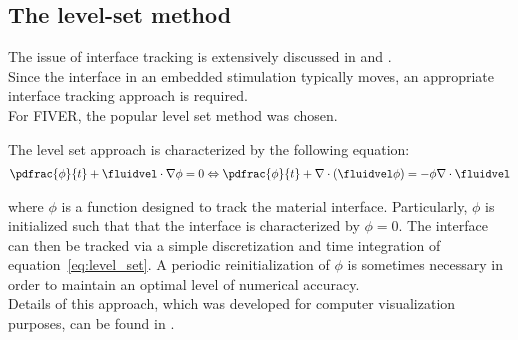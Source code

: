 \documentclass[../main.tex]{subfiles}
\begin{document}
\subsection{The level-set method}\label{sec:interface_tracking}

The issue of interface tracking is extensively discussed in \cite{Wang2012} and \cite{Fedkiw2003}.\\

Since the interface in an embedded stimulation typically moves, an appropriate interface tracking approach is required.\\
For \ac{FIVER}, the popular level set method \cite{Sethian1999} was chosen.

The level set approach is characterized by the following equation:
\begin{align}\label{eq:level_set}
\pdfrac{\phi}{t}+\fluidvel\cdot\nabla\phi=0 \Leftrightarrow \pdfrac{\phi}{t}+\nabla\cdot(\fluidvel\phi)=-\phi\nabla\cdot\fluidvel
\end{align}

where $\phi$ is a function designed to track the material interface. Particularly, $\phi$ is initialized such that that the interface is characterized by $\phi=0$. The interface can then be tracked via a simple discretization and time integration of equation~\eqref{eq:level_set}.
A periodic reinitialization of $\phi$ is sometimes necessary in order to maintain an optimal level of numerical accuracy.\\ 
Details of this approach, which was developed for computer visualization purposes, can be found in \cite{Sethian1999}.
\end{document}
